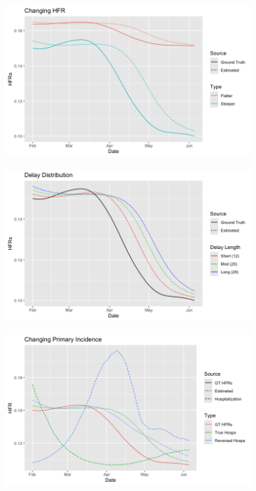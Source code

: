 \documentclass{article}
\begin{document}
\begin{figure}
     \centering
     \begin{subfigure}[b]{0.32\linewidth}
         \centering
         \includegraphics[width=\linewidth]{Figs/toy_chging_hfr.png}
         \caption{}
         \label{fig:toy_hfr}
     \end{subfigure}
     \begin{subfigure}[b]{0.32\linewidth}
         \centering
         \includegraphics[width=\linewidth]{Figs/toy_delay_distr.png}
         \caption{}
         \label{fig:toy_delay}
     \end{subfigure}
     \begin{subfigure}[b]{0.32\linewidth}
         \centering
         \includegraphics[width=\linewidth]{Figs/toy_chging_primary.png}

\end{subfigure}
\end{figure}
\end{document}
